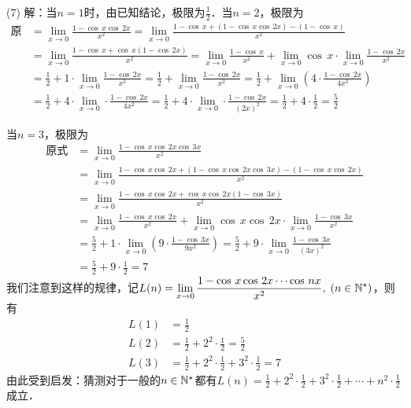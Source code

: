 (7) 解：当$n=1$时，由已知结论，极限为$\displaystyle\frac{1}{2}$．当$n=2$，极限为
\begin{align}
\text{原式} &= \lim_{x \to 0} \displaystyle\frac{1-\cos \, x \cos \, 2x}{x^2} = \lim_{x \to 0} \frac{1 - \cos \, x + (1 - \cos \, x \cos \, 2x) - (1 - \cos \, x)}{x^2} \\
&= \lim_{x \to 0} \frac{1 - \cos \, x + \cos \, x (1 - \cos \, 2x)}{x^2} = \lim_{x \to 0} \frac{1 - \cos \, x}{x^2} + \lim_{x \to 0} \cos \, x \cdot \lim_{x \to 0} \frac{1-\cos \, 2x}{x^2} \\
&= \frac{1}{2} + 1 \cdot \lim_{x \to 0} \frac{1-\cos \, 2x}{x^2} = \frac{1}{2} + \lim_{x \to 0} \frac{1-\cos \, 2x}{x^2} = \frac{1}{2} + \lim_{x \to 0} \left( 4 \cdot \frac{1-\cos \, 2x}{4x^2} \right) \\
&= \frac{1}{2} + 4 \cdot \lim_{x \to 0} \cdot \frac{1-\cos \, 2x}{4x^2} = \frac{1}{2} + 4 \cdot \lim_{x \to 0} \cdot \frac{1-\cos \, 2x}{(2x)^2} = \frac{1}{2} + 4 \cdot \frac{1}{2} = \frac{5}{2}
\end{align}

当$n=3$，极限为
\begin{align}
    \text{原式} &= \lim_{x \to 0} \frac{1-\cos \, x \cos \, 2x \cos \, 3x}{x^2} \\
    &= \lim_{x \to 0} \frac{1-\cos \, x \cos \, 2x + (1-\cos \, x \cos \, 2x \cos \, 3x) - (1-\cos \, x \cos \, 2x)}{x^2} \\
    &= \lim_{x \to 0} \frac{1-\cos \, x \cos \, 2x + \cos \, x \cos \, 2x(1-\cos \, 3x)}{x^2} \\
    &= \lim_{x \to 0} \frac{1-\cos \, x \cos \, 2x}{x^2} + \lim_{x \to 0} \cos \, x \cos \, 2x \cdot \lim_{x \to 0} \frac{1-\cos \, 3x}{x^2} \\
    &= \frac{5}{2} + 1 \cdot \lim_{x \to 0} \left( 9 \cdot \frac{1-\cos \, 3x}{9 x^2} \right) = \frac{5}{2} + 9 \cdot \lim_{x \to 0} \frac{1-\cos \, 3x}{(3x)^2} \\
    &= \frac{5}{2} + 9 \cdot \frac{1}{2} = 7
\end{align}
我们注意到这样的规律，记$L(n) = \displaystyle\lim_{x \to 0} \displaystyle\frac{1-\cos \, x \cos \, 2x \cdots \cos \, nx}{x^2}, \; (n \in \mathbb{N}^\star)$，则有
\begin{align}
L(1) &= \frac{1}{2} \\
L(2) &= \frac{1}{2} + 2^2 \cdot \frac{1}{2} = \frac{5}{2} \\
L(3) &= \frac{1}{2} + 2^2 \cdot \frac{1}{2} + 3^2 \cdot \frac{1}{2} = 7
\end{align}
由此受到启发：猜测对于一般的$n \in \mathbb{N}^\star$都有$L(n) = \displaystyle\frac{1}{2} + 2^2 \cdot \displaystyle\frac{1}{2} + 3^2 \cdot \displaystyle\frac{1}{2} + \cdots + n^2 \cdot \displaystyle\frac{1}{2}$成立．

